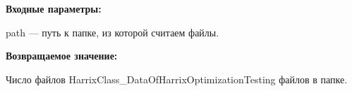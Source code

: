 \textbf{Входные параметры:}

path --- путь к папке, из которой считаем файлы.

\textbf{Возвращаемое значение:}

Число файлов HarrixClass\_DataOfHarrixOptimizationTesting файлов в папке.
